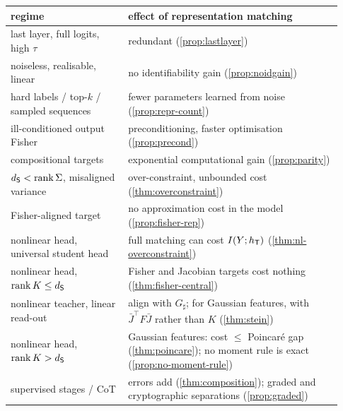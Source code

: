 \begin{center}
\begin{tabular}{@{}p{0.33\linewidth}p{0.6\linewidth}@{}}
\toprule
regime & effect of representation matching\\\midrule
last layer, full logits, high $\tau$ & redundant (\cref{prop:lastlayer})\\
noiseless, realisable, linear & no identifiability gain (\cref{prop:noidgain})\\
hard labels / top-$k$ / sampled sequences & fewer parameters learned from noise (\cref{prop:repr-count})\\
ill-conditioned output Fisher & preconditioning, faster optimisation (\cref{prop:precond})\\
compositional targets & exponential computational gain (\cref{prop:parity})\\
$d_{\mathsf{S}}<\operatorname{rank}\Sigma$, misaligned variance & over-constraint, unbounded cost (\cref{thm:overconstraint})\\
Fisher-aligned target & no approximation cost in the model (\cref{prop:fisher-rep})\\
nonlinear head, universal student head & full matching can cost $I(Y;h_{\mathsf{T}})$ (\cref{thm:nl-overconstraint})\\
nonlinear head, $\operatorname{rank} K\le d_{\mathsf{S}}$ & Fisher and Jacobian targets cost nothing (\cref{thm:fisher-central})\\
nonlinear teacher, linear read-out & align with $G_\sharp$; for Gaussian features, with $\bar J^\top F\bar J$ rather than $K$ (\cref{thm:stein})\\
nonlinear head, $\operatorname{rank} K>d_{\mathsf{S}}$ & Gaussian features: cost $\le$ Poincaré gap (\cref{thm:poincare}); no moment rule is exact (\cref{prop:no-moment-rule})\\
supervised stages / CoT & errors add (\cref{thm:composition}); graded and cryptographic separations (\cref{prop:graded})\\\bottomrule
\end{tabular}
\end{center}
